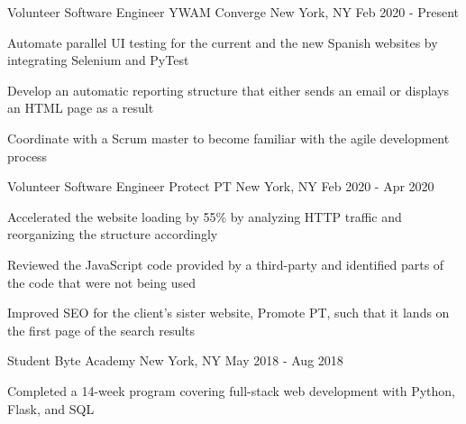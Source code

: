

\begin{cventries}

\cventry
  {Volunteer Software Engineer} %
  {YWAM Converge} %
  {New York, NY} %
  {Feb 2020 - Present} %
  {
    \begin{cvitems} %
      \item {Automate parallel UI testing for the current and the new Spanish websites by integrating Selenium and PyTest}
      \item {Develop an automatic reporting structure that either sends an email or displays an HTML page as a result}
      \item {Coordinate with a Scrum master to become familiar with the agile development process}
    \end{cvitems}
  }

\cventry
  {Volunteer Software Engineer} %
  {Protect PT} %
  {New York, NY} %
  {Feb 2020 - Apr 2020} %
  {
    \begin{cvitems} %
      \item {Accelerated the website loading by 55\% by analyzing HTTP traffic and reorganizing the structure accordingly}
      \item {Reviewed the JavaScript code provided by a third-party and identified parts of the code that were not being used}
      \item {Improved SEO for the client's sister website, Promote PT, such that it lands on the first page of the search results}
    \end{cvitems}
  }

  \cventry
    {Student} %
    {Byte Academy} %
    {New York, NY} %
    {May 2018 - Aug 2018} %
    {
      \begin{cvitems} %
        \item {Completed a 14-week program covering full-stack web development with Python, Flask, and SQL}
      \end{cvitems}
    }


\end{cventries}
